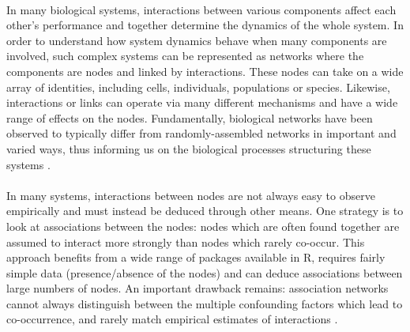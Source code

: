 \documentclass[a4,12pt]{article}
\begin{document}
    \paragraph{}
    In many biological systems, interactions between various components affect each other's performance and together determine the dynamics of the whole system. In order to understand how system dynamics behave when many components are involved, such complex systems can be represented as networks where the components are nodes and linked by interactions. These nodes can take on a wide array of identities, including cells, individuals, populations or species. Likewise, interactions or links can operate via many different mechanisms and have a wide range of effects on the nodes. Fundamentally, biological networks have been observed to typically differ from randomly-assembled networks in important and varied ways, thus informing us on the biological processes structuring these systems \parencite{Dunne2002}.

    \paragraph{} 
    In many systems, interactions between nodes are not always easy to observe empirically and must instead be deduced through other means. One strategy is to look at associations between the nodes: nodes which are often found together are assumed to interact more strongly than nodes which rarely co-occur. This approach benefits from a wide range of packages available in R, requires fairly simple data (presence/absence of the nodes) and can deduce associations between large numbers of nodes. An important drawback remains: association networks cannot always distinguish between the multiple confounding factors which lead to co-occurrence, and rarely match empirical estimates of interactions \parencite{Sander2017,Barner2018, Thurman2019, Blanchet2020}.
\end{document}
